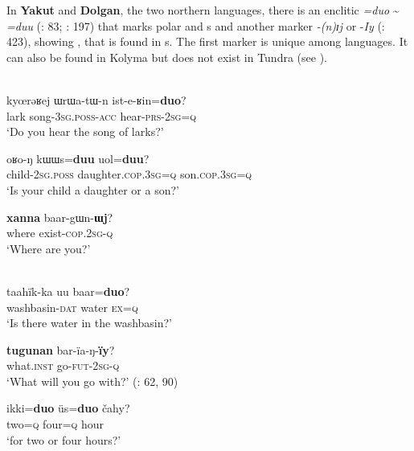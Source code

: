 In \textbf{Yakut} and \textbf{Dolgan}, the two northern  languages, there is an enclitic \textit{=duo} {\textasciitilde} \textit{=duu} (\citealt{Stachowski1993}: 83; \citealt{Ebata2011}: 197) that marks polar and s and another marker \textit{-(n)ɪj} \citep[197]{Ebata2011} or -\textit{Iy} (\citealt{Stachowski1998}: 423), showing , that is found in s. The first marker is unique among  languages. It can also be found in Kolyma  \citep[245]{Nagasaki2011} but does not exist in Tundra  (see ).

\ea%
    \label{ex:turk:62}
    \\
    \ea
    \gll kyœrəʁej  ɯrɯa-tɯ-n    ist-e-ʁin=\textbf{{duo}}?\\
    lark    song-3\textsc{sg}.\textsc{poss}-\textsc{acc}  hear-\textsc{prs}-2\textsc{sg}=\textsc{q}\\
    \glt ‘Do you hear the song of larks?’
    
    \ex
    \gll oʁo-ŋ      kɯɯs=\textbf{{duu}} uol=\textbf{{duu}}?\\
    child-2\textsc{sg}.\textsc{poss}  daughter.\textsc{cop}.3\textsc{sg}=\textsc{q}  son.\textsc{cop}.3\textsc{sg}=\textsc{q}\\
    \glt ‘Is your child a daughter or a son?’
    
    \ex
    \gll \textbf{{xanna}} baar-gɯn-\textbf{{ɯj}}?\\
    where exist-\textsc{cop}.2\textsc{sg}-\textsc{q}\\
    \glt ‘Where are you?’ \citep[197]{Ebata2011}\z\z

\ea%
    \label{ex:turk:63}
    \\
    \ea
    \gll taahïk-ka    uu  baar=\textbf{{duo}}?\\
    washbasin-\textsc{dat}  water  \textsc{ex}=\textsc{q}\\
    \glt ‘Is there water in the washbasin?’
    
    \ex
    \gll \textbf{{tugunan}} bar-ïa-ŋ-\textbf{{ïy}}?\\
    what.\textsc{inst}  go-\textsc{fut}-2\textsc{sg}-\textsc{q}\\
    \glt ‘What will you go with?’ (\citealt{LiYong-Sŏng2011}: 62, 90)
    
    \ex
    \gll ikki=\textbf{{duo}} üs=\textbf{{duo}} čahy?\\
    two=\textsc{q}    four=\textsc{q}    hour\\
    \glt ‘for two or four hours?’ \citep[83]{Stachowski1993}\z\z

